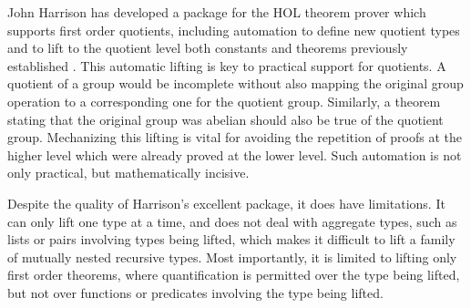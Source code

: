 \documentclass[envcountsame,runningheads]{llncs}
\begin{document}
John Harrison has developed a package for the 
HOL
theorem prover which supports first order quotients,
including automation to define new quotient types
and to lift to the quotient level both constants 
and theorems previously established
\cite{Har98}.
%
This automatic lifting is key to practical support for quotients.
A quotient of a group
would be incomplete without also mapping the original group
operation to a corresponding one for the quotient group.
Similarly, a theorem stating that the original group was abelian
should also be true of the quotient group.
Mechanizing this lifting is vital for avoiding the repetition of proofs
at the higher level which were already proved at the lower level.
Such automation is not only practical, but mathematically incisive.

Despite the quality of Harrison's excellent package, it does have
limitations.  It can only lift one type at a time,
and does not deal with aggregate types, such as lists or pairs
involving types being lifted,
which makes it difficult to lift a family of mutually nested recursive types.
Most importantly, it is limited to lifting only first order theorems,
where
quantification is permitted over the
type being lifted, but not over functions or predicates involving the type
being lifted.
\end{document}
